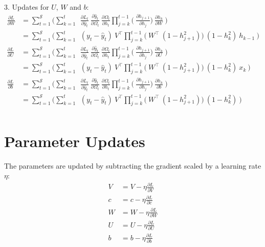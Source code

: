 \documentclass{article}
\begin{document}
3. Updates for $U$, $W$ and $b$:
\begin{align*}
    \frac{\partial L}{ \partial{W}} &= \sum_{t=1}^{\mathcal{S}} 
	\bigg(	
	 \sum_{k=1}^{t} ~
	~\frac{\partial L_t}{\partial \hat{y}_t}
        ~\frac{\partial \hat{y}_t}{\partial \Omega_t}
	~\frac{\partial \Omega_t}{\partial h_t}
        \prod_{j=k}^{t-1} \bigg(
	~\frac{\partial h_{j+1}}{\partial h_{j}}
        \bigg)
	~\frac{\partial h_k}{\partial W}~
	\bigg) \\
  &= \sum_{t=1}^{\mathcal{S}} 
	\bigg(	
	 \sum_{k=1}^{t} ~
	~(y_t - \hat{y}_t)
	~V^\top
        \prod_{j=k}^{t-1} \bigg(
	~W^\top ~ (1 - h_{j+1}^2)
        \bigg)
	~(1-h_k^2)~ h_{k-1}~
	\bigg) \\
     \frac{\partial L}{ \partial{U}} &= \sum_{t=1}^{\mathcal{S}} 
	\bigg(	
	 \sum_{k=1}^{t} ~
	~\frac{\partial L_t}{\partial \hat{y}_t}
        ~\frac{\partial \hat{y}_t}{\partial \Omega_t}
	~\frac{\partial \Omega_t}{\partial h_t}
        \prod_{j=k}^{t-1} \bigg(
	~\frac{\partial h_{j+1}}{\partial h_{j}}
        \bigg)
	~\frac{\partial h_k}{\partial U}~
	\bigg) \\
  &= \sum_{t=1}^{\mathcal{S}} 
	\bigg(	
	 \sum_{k=1}^{t} ~
	~(y_t - \hat{y}_t)
	~V^\top
        \prod_{j=k}^{t-1} \bigg(
	~W^\top ~ (1 - h_{j+1}^2)
        \bigg)
	~(1-h_k^2)~ x_{k}~
	\bigg) \\
     \frac{\partial L}{ \partial{b}} &= \sum_{t=1}^{\mathcal{S}} 
	\bigg(	
	 \sum_{k=1}^{t} ~
	~\frac{\partial L_t}{\partial \hat{y}_t}
        ~\frac{\partial \hat{y}_t}{\partial \Omega_t}
	~\frac{\partial \Omega_t}{\partial h_t}
        \prod_{j=k}^{t-1} \bigg(
	~\frac{\partial h_{j+1}}{\partial h_{j}}
        \bigg)
	~\frac{\partial h_k}{\partial b}~
	\bigg) \\
  &= \sum_{t=1}^{\mathcal{S}} 
	\bigg(	
	 \sum_{k=1}^{t} ~
	~(y_t - \hat{y}_t)
	~V^\top
        \prod_{j=k}^{t-1} \bigg(
	~W^\top ~ (1 - h_{j+1}^2)
        \bigg)
	~(1-h_k^2)~
	\bigg) \\
\end{align*}    

\section*{Parameter Updates}

The parameters are updated by subtracting the gradient scaled by a learning rate $\eta$:
\begin{align*}
V &= V - \eta \frac{\partial L}{\partial V}\\
c &= c - \eta \frac{\partial L}{\partial c}\\
W &= W - \eta \frac{\partial L}{\partial W}\\
U &= U - \eta \frac{\partial L}{\partial U}\\
b &= b - \eta \frac{\partial L}{\partial b}
\end{align*}
\end{document}
